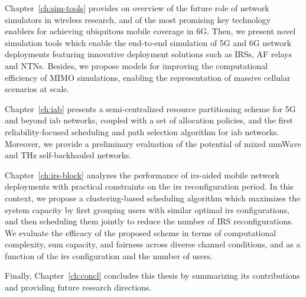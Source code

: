 Chapter~\ref{ch:sim-tools} provides on overview of the future role of network simulators in wireless research, and of the most promising key technology enablers for achieving ubiquitous mobile coverage in 6G. Then, we present novel simulation tools which enable the end-to-end simulation of 5G and 6G network deployments featuring innovative deployment solutions such as IRSs, AF relays and NTNs. Besides, we propose models for improving the computational efficiency of MIMO simulations, enabling the representation of massive cellular scenarios at scale.

Chapter~\ref{ch:iab} presents a semi-centralized resource partitioning scheme for 5G and beyond \gls{iab} networks, coupled with a set of allocation policies, and the first reliability-focused scheduling and path selection algorithm for \gls{iab} networks. Moreover, we provide a preliminary evaluation of the potential of mixed mmWave and THz self-backhauled networks.

Chapter~\ref{ch:irs-block} analyzes the performance of \gls{irs}-aided mobile network deployments with practical constraints on the \gls{irs} reconfiguration period. 
In this context, we propose a clustering-based scheduling algorithm which maximizes the system capacity by first grouping users with similar optimal \gls{irs} configurations, and then scheduling them jointly to reduce the number of IRS reconfigurations.
We evaluate the efficacy of the proposed scheme in terms of computational complexity, sum capacity, and fairness across diverse channel conditions, and as a function of the \gls{irs} configuration and the number of users.

Finally, Chapter~\ref{ch:concl} concludes this thesis by summarizing its contributions and providing future research directions.